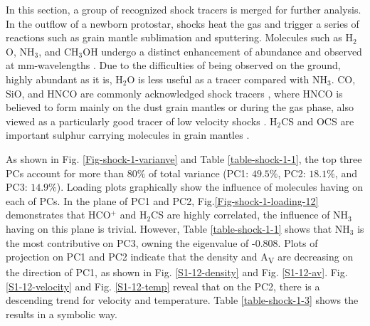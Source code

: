 \documentclass{aa}
\begin{document}
\begin{CJK*}{UTF8}{gbsn}
    In this section, a group of recognized shock tracers is merged for further analysis. 
    In the outflow of a newborn protostar, shocks heat the gas and trigger a series of reactions such as grain mantle sublimation and sputtering. 
    Molecules such as H$_2$O, NH$_3$, and CH$_3$OH undergo a distinct enhancement of abundance \citep{van1998chemical} and observed at mm-wavelengths \citep{bachiller1997shock,garay1998molecular,jorgensen2007prosac}. 
    Due to the difficulties of being observed on the ground, highly abundant as it is, H$_2$O is less useful as a tracer compared with NH$_3$. 
    CO, SiO, and HNCO are commonly acknowledged shock tracers \citep{martin1997sio,rodriguez2010hnco}, where HNCO is believed to form mainly on the dust grain mantles \citep{lopez2015shedding} or during the gas phase, also viewed as a particularly good tracer of low velocity shocks \citep{kelly2017molecular}. H$_2$CS and OCS are important sulphur carrying molecules in grain mantles \citep{codella2005chemical}. 

    As shown in Fig. \ref{Fig-shock-1-varianve} and Table \ref{table-shock-1-1}, the top three PCs account for more than $80\%$ of total variance (PC1: $49.5\%$, PC2: $18.1\%$, and PC3: $14.9\%$). 
    Loading plots graphically show the influence of molecules having on each of PCs. 
    In the plane of PC1 and PC2, Fig.\ref{Fig-shock-1-loading-12} demonstrates that HCO$^+$ and H$_2$CS are highly correlated, the influence of NH$_3$ having on this plane is trivial. 
    However, Table \ref{table-shock-1-1} shows that NH$_3$ is the most contributive on PC3, owning the eigenvalue of -0.808. 
    Plots of projection on PC1 and PC2 indicate that the density and A\textsubscript{V} are decreasing on the direction of PC1, as shown in Fig. \ref{S1-12-density} and Fig. \ref{S1-12-av}. 
    Fig. \ref{S1-12-velocity} and Fig. \ref{S1-12-temp} reveal that on the PC2, there is a descending trend for velocity and temperature. 
    Table \ref{table-shock-1-3} shows the results in a symbolic way.


\end{CJK*}
\end{document}
